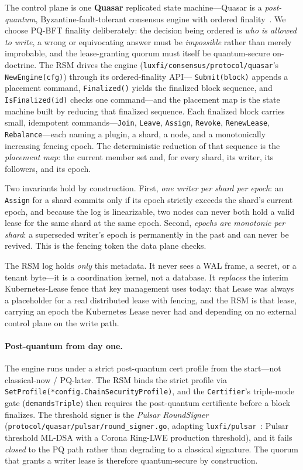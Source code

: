 \documentclass[11pt]{article}
\begin{document}
The control plane is one \textbf{Quasar} replicated state machine---Quasar is
a \emph{post-quantum}, Byzantine-fault-tolerant consensus engine with ordered
finality~\cite{luxconsensus,pulsar}. We choose PQ-BFT finality deliberately:
the decision being ordered is \emph{who is allowed to write}, a wrong or
equivocating answer must be \emph{impossible} rather than merely improbable,
and the lease-granting quorum must itself be quantum-secure on-doctrine. The
RSM drives the engine (\texttt{luxfi/consensus/protocol/quasar}'s
\texttt{NewEngine(cfg)}) through its ordered-finality API---%
\texttt{Submit(block)} appends a placement command,
\texttt{Finalized()} yields the finalized block sequence, and
\texttt{IsFinalized(id)} checks one command---and the placement map is the
state machine built by reducing that finalized sequence. Each finalized block
carries small, idempotent commands---\texttt{Join}, \texttt{Leave},
\texttt{Assign}, \texttt{Revoke}, \texttt{RenewLease},
\texttt{Rebalance}---each naming a plugin, a shard, a node, and a
monotonically increasing fencing epoch. The deterministic reduction of that
sequence is the \emph{placement map}: the current member set and, for every
shard, its writer, its followers, and its epoch.

Two invariants hold by construction. First, \emph{one writer per shard per
epoch}: an \texttt{Assign} for a shard commits only if its epoch strictly
exceeds the shard's current epoch, and because the log is linearizable, two
nodes can never both hold a valid lease for the same shard at the same epoch.
Second, \emph{epochs are monotonic per shard}: a superseded writer's epoch is
permanently in the past and can never be revived. This is the fencing token
the data plane checks.

The RSM log holds \emph{only} this metadata. It never sees a WAL frame, a
secret, or a tenant byte---it is a coordination kernel, not a database. It
\emph{replaces} the interim Kubernetes-Lease fence that key management uses
today: that Lease was always a placeholder for a real distributed lease with
fencing, and the RSM is that lease, carrying an epoch the Kubernetes Lease
never had and depending on no external control plane on the write path.

\paragraph{Post-quantum from day one.}
The engine runs under a strict post-quantum cert profile from the
start---not classical-now / PQ-later. The RSM binds the strict profile via
\texttt{SetProfile(*config.ChainSecurityProfile)}, and the
\texttt{Certifier}'s triple-mode gate (\texttt{demandsTriple}) then requires
the post-quantum certificate before a block finalizes. The threshold signer
is the \emph{Pulsar RoundSigner}
(\texttt{protocol/quasar/pulsar/round\_signer.go}, adapting
\texttt{luxfi/pulsar}~\cite{pulsar}: Pulsar threshold ML-DSA with a Corona
Ring-LWE production threshold), and it fails \emph{closed} to the PQ path
rather than degrading to a classical signature. The quorum that grants a
writer lease is therefore quantum-secure by construction.
\end{document}
